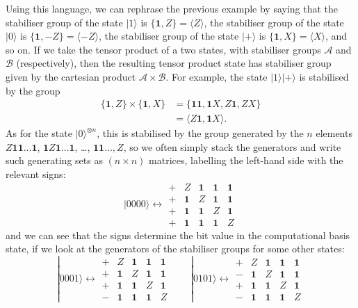 \documentclass[fleqn]{article}
\begin{document}
Using this language, we can rephrase the previous example by saying that the stabiliser group of the state \(|1\rangle\) is \(\{\mathbf{1},Z\}=\langle Z\rangle\), the stabiliser group of the state \(|0\rangle\) is \(\{\mathbf{1},-Z\}=\langle -Z\rangle\), the stabiliser group of the state \(|+\rangle\) is \(\{\mathbf{1},X\}=\langle X\rangle\), and so on.
If we take the tensor product of a two states, with stabiliser groups \(\mathcal{A}\) and \(\mathcal{B}\) (respectively), then the resulting tensor product state has stabiliser group given by the cartesian product \(\mathcal{A}\times\mathcal{B}\).
For example, the state \(|1\rangle|+\rangle\) is stabilised by the group
\[
  \begin{aligned}
    \{\mathbf{1},Z\}\times\{\mathbf{1},X\}
    &= \{\mathbf{1}\mathbf{1},\mathbf{1}X,Z\mathbf{1},ZX\}
  \\&= \langle Z\mathbf{1},\mathbf{1}X\rangle.
  \end{aligned}
\]
As for the state \(|0\rangle^{\otimes n}\), this is stabilised by the group generated by the \(n\) elements \(Z\mathbf{1}\mathbf{1}\ldots\mathbf{1}\), \(\mathbf{1}Z\mathbf{1}\ldots\mathbf{1}\), \ldots, \(\mathbf{1}\mathbf{1}\ldots,Z\), so we often simply stack the generators and write such generating sets as \((n\times n)\) matrices, labelling the left-hand side with the relevant signs:
\[
  |0000\rangle
  \longleftrightarrow
  \begin{array}{c|cccc|}
    +&Z&\mathbf{1}&\mathbf{1}&\mathbf{1}
  \\+&\mathbf{1}&Z&\mathbf{1}&\mathbf{1}
  \\+&\mathbf{1}&\mathbf{1}&Z&\mathbf{1}
  \\+&\mathbf{1}&\mathbf{1}&\mathbf{1}&Z
  \end{array}
\]
and we can see that the signs determine the bit value in the computational basis state, if we look at the generators of the stabiliser groups for some other states:
\[
  |0001\rangle
  \longleftrightarrow
  \begin{array}{c|cccc|}
    +&Z&\mathbf{1}&\mathbf{1}&\mathbf{1}
  \\+&\mathbf{1}&Z&\mathbf{1}&\mathbf{1}
  \\+&\mathbf{1}&\mathbf{1}&Z&\mathbf{1}
  \\-&\mathbf{1}&\mathbf{1}&\mathbf{1}&Z
  \end{array}
  \qquad
  |0101\rangle
  \longleftrightarrow
  \begin{array}{c|cccc|}
    +&Z&\mathbf{1}&\mathbf{1}&\mathbf{1}
  \\-&\mathbf{1}&Z&\mathbf{1}&\mathbf{1}
  \\+&\mathbf{1}&\mathbf{1}&Z&\mathbf{1}
  \\-&\mathbf{1}&\mathbf{1}&\mathbf{1}&Z
  \end{array}
\]
\end{document}
